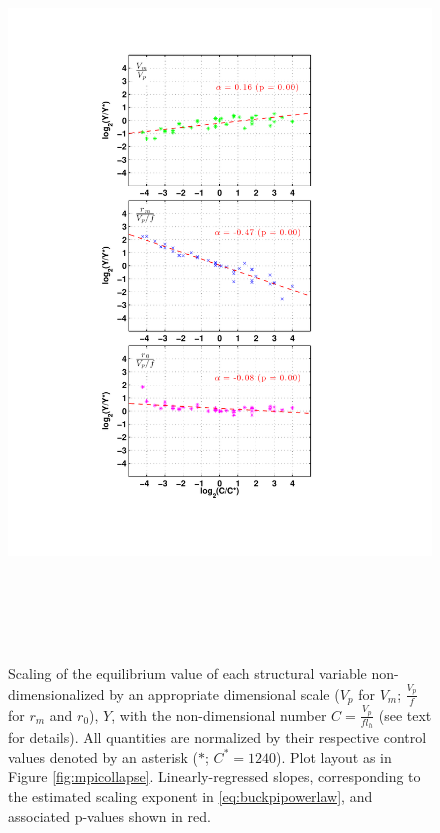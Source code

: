 \documentclass[12pt]{article}
\begin{document}
\begin{figure}[h!]
\centering
  \noindent\includegraphics[width=15cm,height=20cm]{FIGURES/Nondimensional_scaling.pdf}
\caption{Scaling of the equilibrium value of each structural variable non-dimensionalized by an appropriate dimensional scale ($V_p$ for $V_m$; $\frac{V_p}{f}$ for $r_m$ and $r_0$), $Y$, with the non-dimensional number $C = \frac{V_p}{fl_h}$ (see text for details). All quantities are normalized by their respective control values denoted by an asterisk ($*$; $C^* = 1240$). Plot layout as in Figure \ref{fig:mpicollapse}.  Linearly-regressed slopes, corresponding to the estimated scaling exponent in \eqref{eq:buckpipowerlaw}, and associated p-values shown in red.}\label{fig:nondimscaling}
\end{figure}
\end{document}
